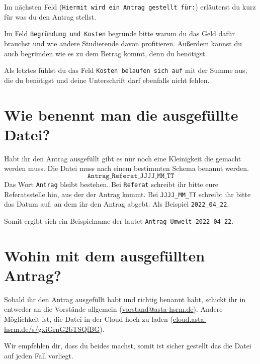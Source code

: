 Im nächsten Feld (\texttt{Hiermit wird ein Antrag gestellt für:}) erläuterst du kurz für was du den Antrag stellst. 

Im Feld \texttt{Begründung und Kosten} begründe bitte warum du das Geld dafür brauchst und wie andere Studierende davon profitieren. 
Außerdem kannst du auch begründen wie es zu dem Betrag kommt, denn du benötigst.

Als letztes fühlst du das Feld \texttt{Kosten belaufen sich auf} mit der Summe aus, die du benötigst und deine Unterschrift darf ebenfalls nicht fehlen.


\section{Wie benennt man die ausgefüllte Datei?}
Habt ihr den Antrag ausgefüllt gibt es nur noch eine Kleinigkeit die gemacht werden muss. 
Die Datei muss nach einem bestimmten Schema benannt werden. 
\[\texttt{Antrag\_Referat\_JJJJ\_MM\_TT}\]
Das Wort \texttt{Antrag} bleibt bestehen. Bei \texttt{Referat} schreibt ihr bitte eure Referatsstelle hin, aus der der Antrag kommt.
Bei \texttt{JJJJ\_MM\_TT} schreibt ihr bitte das Datum auf, an dem ihr den Antrag abgebt. Als Beispiel \texttt{2022\_04\_22}.

Somit ergibt sich ein Beispielname der lautet \texttt{Antrag\_Umwelt\_2022\_04\_22}.


\section{Wohin mit dem ausgefüllten Antrag?}
Sobald ihr den Antrag ausgefüllt habt und richtig benannt habt, schickt ihr in entweder an die Vorstände allgemein (\href{mailto:vorstand@asta-hsrm.de}{vorstand@asta-hsrm.de}). 
Andere Möglichkeit ist, die Datei in der Cloud hoch zu laden (\href{https://cloud.asta-hsrm.de/s/gxiGrnG2bTSQfBG}{cloud.asta-hsrm.de/s/gxiGrnG2bTSQfBG}).

Wir empfehlen dir, dass du beides machst, somit ist sicher gestellt das die Datei auf jeden Fall vorliegt. 


